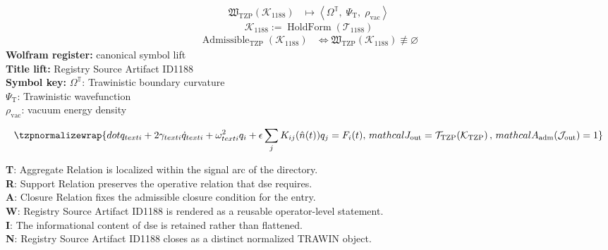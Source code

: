 \noindent
\begin{minipage}[t]{0.48\linewidth}
\begingroup
\small
\[
\begin{aligned}
\mathfrak{W}_{\mathrm{TZP}}\!\left(\mathcal{K}_{1188}\right)
&\longmapsto
\left\langle \Omega^{\mathbb{T}},\; \Psi_{\mathrm{T}},\; \rho_{\mathrm{vac}} \right\rangle
\end{aligned}
\]
\[
\mathcal{K}_{1188}
:=
\operatorname{HoldForm}\!\left(\mathcal{T}_{1188}\right)
\]
\[
\begin{aligned}
\operatorname{Admissible}_{\mathrm{TZP}}\!\left(\mathcal{K}_{1188}\right)
&\Longleftrightarrow
\mathfrak{W}_{\mathrm{TZP}}\!\left(\mathcal{K}_{1188}\right)\not\equiv\varnothing
\end{aligned}
\]
\textbf{Wolfram register:} canonical symbol lift\\
\textbf{Title lift:} Registry Source Artifact ID1188\\
\textbf{Symbol key:} \(\Omega^{\mathbb{T}}\): Trawinistic boundary curvature\\ \(\Psi_{\mathrm{T}}\): Trawinistic wavefunction\\ \(\rho_{\mathrm{vac}}\): vacuum energy density
\par
\endgroup
\end{minipage}\hfill
\begin{minipage}[t]{0.48\linewidth}
\[
\tzpnormalizewrap{dot{q}_{ text{i}}+2\gamma_{ text{i}}\dot{q}_{ text{i}}+\omega_{ text{i}}^{2}q_{i}+\epsilon\sum_{j}K_{ij}(\hat{n}(t))q_{j}=F_{i}(t),\,mathcal{J}_{\mathrm{out}} = \mathcal{T}_{\mathrm{TZP}}\!\left(\mathcal{K}_{\mathrm{TZP}}\right),\,mathcal{A}_{\mathrm{adm}}\!\left(\mathcal{J}_{\mathrm{out}}\right)=1}
\]

\small
\textbf{T}: Aggregate Relation is localized within the signal arc of the directory.\\
\textbf{R}: Support Relation preserves the operative relation that dse requires.\\
\textbf{A}: Closure Relation fixes the admissible closure condition for the entry.\\
\textbf{W}: Registry Source Artifact ID1188 is rendered as a reusable operator-level statement.\\
\textbf{I}: The informational content of dse is retained rather than flattened.\\
\textbf{N}: Registry Source Artifact ID1188 closes as a distinct normalized TRAWIN object.
\normalsize
\end{minipage}

